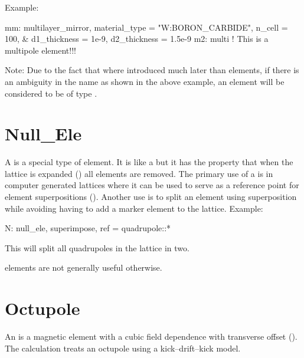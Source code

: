 {Example:
\begin{example}
  mm: multilayer_mirror, material_type = "W:BORON_CARBIDE", n_cell = 100, &
            d1_thickness = 1e-9, d2_thickness = 1.5e-9
  m2: multi    ! This is a multipole element!!!
\end{example}
Note: Due to the fact that  where introduced much later than 
elements, if there is an ambiguity in the name as shown in the above example, an element will be
considered to be of type .

\newpage

\section{Null_Ele}
\label{s:null.ele}

A  is a special type of element. It is like a  but it has the property that
when the lattice is expanded () all  elements are removed. The
primary use of a  is in computer generated lattices where it can be used to serve as a
reference point for element superpositions (). Another use is to split an element
using superposition while avoiding having to add a marker element to the lattice. Example:
\begin{example}
  N: null_ele, superimpose, ref = quadrupole::*
\end{example}
This will split all quadrupoles in the lattice in two.

 elements are not generally useful otherwise.


\newpage

\section{Octupole}
\label{s:oct}

An  is a magnetic element with a cubic field dependence
with transverse offset ().  The 
calculation treats an octupole using a kick--drift--kick model.

}
